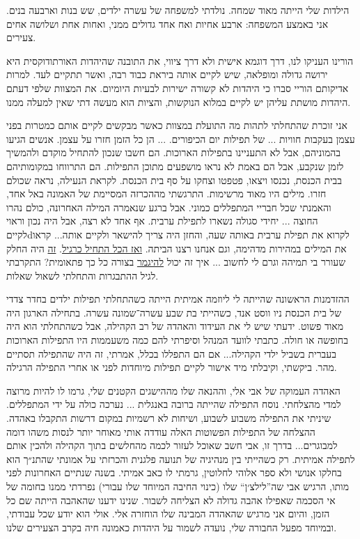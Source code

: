 \documentclass[14pt, article, extrafontsizes, twopage, a4paper]{memoir}
\begin{document}
הילדות שלי הייתה מאוד שמחה. נולדתי למשפחה של עשרה ילדים, שש בנות וארבעה בנים. אני באמצע המשפחה: ארבע אחיות ואח אחד גדולים ממני, ואחות אחת ושלושה אחים צעירים.

הורינו העניקו לנו, דרך דוגמא אישית ולא דרך ציווי, את התובנה שהיהדות האורתודוקסית היא ירושה גדולה ומופלאה, שיש לקיים אותה ביראת כבוד רבה, ואשר תתקיים לעד. למרות אדיקותם הוריי סברו כי היהדות לא קשורה ישירות לבעיות היומיום. את המצוות שלפי דעתם היהדות מושתת עליהן יש לקיים במלוא הנוקשות, והציות הוא מעשה דתי שאין למעלה ממנו.

אני זוכרת שהתחלתי לתהות מה התועלת במצוות כאשר מבקשים לקיים אותם כמטרות בפני עצמן בעקבות חוויות  ... של תפילות יום הכיפורים. ... הן כל הזמן חזרו על עצמן. אנשים הגיעו בהמוניהם, אבל לא התעניינו בתפילות הארוכות. הם חשבו שנכון להתחיל מוקדם ולהמשיך לזמן שנקבע, אבל הם באמת לא נראו מושפעים מתוכן התפילות. הם התרווחו במקומותיהם בבית הכנסת, נכנסו ויצאו, פטפטו וצחקו על סף בית הכנסת. לקראת הנעילה, נראה שכולם חזרו. מילים היו מאוד מרשימות. התרגשתי מההכרזה המסיימת של האמונה באל אחד, והאמנתי שכל חבריי המתפללים כמוני.
אבל ברגע שנאמרה המילה האחרונה, כולם נהרו החוצה ... יחידי סגולה נשארו לתפילת ערבית. אף אחד לא רצה, אבל היה נכון וראוי לקייםdלקרוא את תפילת ערבית באותה שעה, והחזן היה צריך להישאר ולקיים אותה... קראו את המילים במהירות מדהימה, וגם אנחנו רצנו הביתה. \underline{ואז הכל התחיל כרגיל}. \underline{זה} היה החלק שעורר בי תמיהה וגרם לי לחשוב ... איך זה יכול \underline{להיגמר} בצורה כל כך פתאומית? התקרבתי לגיל ההתבגרות והתחלתי לשאול שאלות.

ההזדמנות הראשונה שהייתה לי ליוזמה אמיתית הייתה כשהתחלתי תפילות ילדים בחדר צדדי של בית הכנסת ניו ווסט אנד, כשהייתי בת שבע עשרה־שמונה עשרה. בתחילה הארגון היה מאוד פשוט. ידעתי שיש לי את העידוד והאהדה של רב הקהילה, אבל כשהתחלתי הוא היה בחופשה או חולה. כתבתי לוועד המנהל וסיפרתי להם כמה משעממות היו התפילות הארוכות בעברית בשביל ילדי הקהילה... אם הם התפללו בכלל, אמרתי, זה היה שהתפילה תסתיים מהר. ביקשתי, וקיבלתי מיד אישור לקיים תפילות מיוחדות לפני או אחרי התפילה הרגילה.

האהדה העמוקה של אבי אלי, וההנאה שלו מההישגים הקטנים שלי, גרמו לו להיות מרוצה למדי מהצלחתי. נוסח התפילה שהייתה ברובה באנגלית ... נערכה כולה על ידי המתפללים. שיניתי את התפילה משבוע לשבוע, ושיחות לא רשמיות במקום דרשות התקבלו באהדה. ההצלחה של התפילות הפשוטות האלה עודדה אותי מאוחר יותר לנסות משהו דומה למבוגרים... בדרך זו, אבי חשב שאוכל לעזור לכמה מהחלשים בתוך הקהילה ולהכין אותם לתפילה אמיתית. רק כשהייתי בין מנהיגיה של תנועה פלגנית והכרזתי על אמונתי שהתנ״ך הוא בחלקו אנושי ולא ספר אלוהי לחלוטין, גרמתי לו כאב אמיתי. בשנה שנתיים האחרונות לפני מותו, הרגיש אבי שה”לילצ׳ן“ שלו (כינוי החיבה המיוחד שלו עבורי) נפרדתי ממנו בחומה של אי הסכמה שאפילו אהבה גדולה לא הצליחה לשבור. שנינו ידענו שהאהבה הייתה שם כל הזמן, והיום אני מרגיש שהאהדה המבינה שלו הוחזרה אלי. אולי הוא יודע שכל עבודתי, ובמיוחד מפעל החבורה שלי, נועדה לשמור על היהדות כאמונה חיה בקרב הצעירים שלנו.
\end{document}
